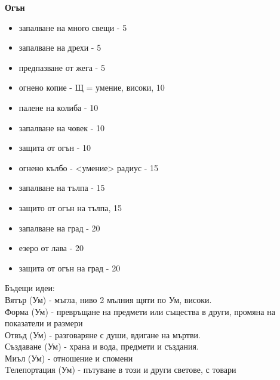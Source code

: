 \vspace{1cm}
\textbf{Огън}
\begin{itemize}
  \item{запалване на много свещи - 5}
  \item{запалване на дрехи - 5}
  \item{предпазване от жега - 5}
  \item{огнено копие - Щ = умение, високи, 10}
  \item{палене на колиба - 10}
  \item{запалване на човек - 10}
  \item{защита от огън - 10}
  \item{огнено кълбо - <умение> радиус - 15}
  \item{запалване на тълпа - 15}
  \item{защито от огън на тълпа, 15}
  \item{запалване на град - 20}
  \item{езеро от лава - 20}
  \item{защита от огън на град - 20}
\end{itemize}

Бъдещи идеи:  \\
Вятър (Ум)        - мъгла, ниво 2 мълния щяти по Ум, високи.                                         \\
Форма (Ум)        - превръщане на предмети или същества в други, промяна на показатели и размери     \\
Отвъд (Ум)        - разговаряне с души, вдигане на мъртви.                                           \\
Създаване (Ум)    - храна и вода, предмети и създания.                                               \\
Миъл (Ум)         - отношение и спомени                                                              \\
Tелепортация (Ум) - пътуване в този и други светове, с товари                                        \\






